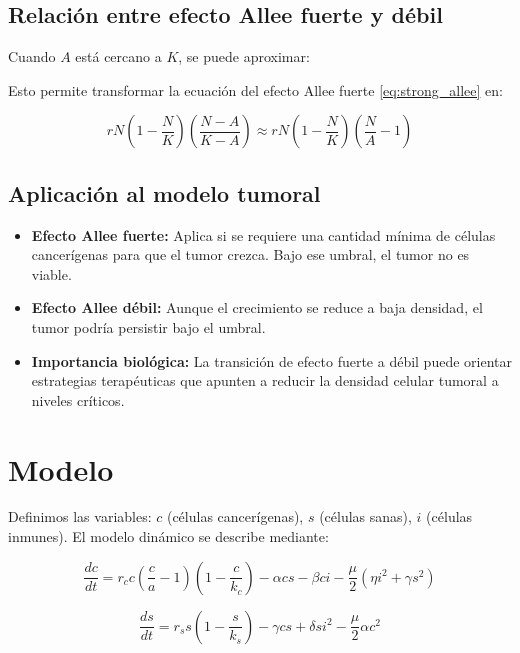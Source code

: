 \documentclass{article}
\begin{document}
\subsection{Relación entre efecto Allee fuerte y débil}

Cuando $A$ está cercano a $K$, se puede aproximar:



Esto permite transformar la ecuación del efecto Allee fuerte \eqref{eq:strong_allee} en:

\begin{equation}
rN \left(1 - \frac{N}{K}\right) \left(\frac{N - A}{K - A}\right) \approx rN \left(1 - \frac{N}{K}\right) \left(\frac{N}{A} - 1\right)
\end{equation}

\subsection{Aplicación al modelo tumoral}

\begin{itemize}
\item \textbf{Efecto Allee fuerte:} Aplica si se requiere una cantidad mínima de células cancerígenas para que el tumor crezca. Bajo ese umbral, el tumor no es viable.
\item \textbf{Efecto Allee débil:} Aunque el crecimiento se reduce a baja densidad, el tumor podría persistir bajo el umbral.
\item \textbf{Importancia biológica:} La transición de efecto fuerte a débil puede orientar estrategias terapéuticas que apunten a reducir la densidad celular tumoral a niveles críticos.
\end{itemize}

\section{Modelo}

Definimos las variables: $c$ (células cancerígenas), $s$ (células sanas), $i$ (células inmunes). El modelo dinámico se describe mediante:

\begin{equation}
\frac{dc}{dt} = r_c c \left(\frac{c}{a} - 1\right)\left(1 - \frac{c}{k_c}\right) - \alpha c s - \beta c i - \frac{\mu}{2} (\eta i^2 + \gamma s^2)
\label{eqn:cancer_dynamic}
\end{equation}

\begin{equation}
\frac{ds}{dt} = r_s s \left(1 - \frac{s}{k_s}\right) - \gamma c s + \delta s i^2 - \frac{\mu}{2} \alpha c^2
\label{eqn:sano_dynamic}
\end{equation}
\end{document}
